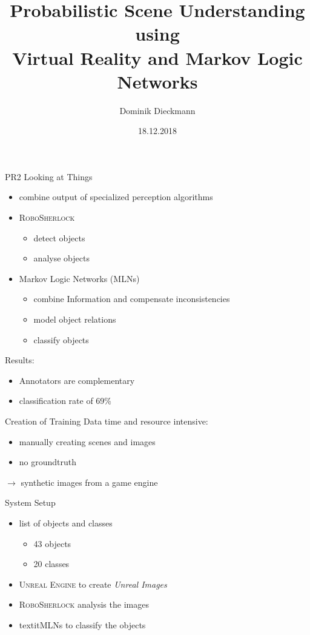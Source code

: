 \documentclass[]{beamer}
\title[Short version]{Probabilistic Scene Understanding using\\ Virtual Reality and Markov Logic Networks}
\subtitle[]{}
\date[]{18.12.2018}
\author[D. Dieckmann]{Dominik Dieckmann}
\institute[Uni Bremen]{Institute for Artificial Intelligence \\ University Bremen}
\begin{document}
\beamertemplatenavigationsymbolsempty

\begin{frame}
	\maketitle
\end{frame}

\begin{frame}{PR2 Looking at Things}
	\begin{itemize}
		\item combine output of specialized perception algorithms 
		\item \textsc{RoboSherlock}
			\begin{itemize}
				\item detect objects
				\item analyse objects
			\end{itemize}
		\item Markov Logic Networks (MLNs)
			\begin{itemize}
				\item combine Information and compensate inconsistencies
				\item model object relations
				\item classify objects
			\end{itemize}
	\end{itemize}
	\bigskip
Results:
	\begin{itemize}
		\item Annotators are complementary
		\item classification rate of 69\%
	\end{itemize}
\end{frame}

\begin{frame}{Creation of Training Data}
time and resource intensive:
	\begin{itemize}
		\item manually creating scenes and images
		\item no groundtruth
	\end{itemize}
	\bigskip
$\rightarrow$ synthetic images from a game engine
\end{frame}

\begin{frame}{System Setup}
	\begin{itemize}
		\item list of objects and classes
			\begin{itemize}
				\item 43 objects
				\item 20 classes
			\end{itemize}
		\item \textsc{Unreal Engine} to create \textit{Unreal Images}
		\item \textsc{RoboSherlock} analysis the images
		\item textit{MLNs} to classify the objects
	\end{itemize}
\end{frame}
\end{document}
